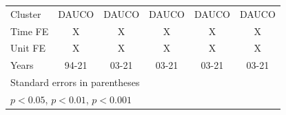 \begin{table}[htbp]
\begin{tabular}{l*{5}{c}}
Cluster             &       DAUCO         &       DAUCO         &       DAUCO         &       DAUCO         &       DAUCO         \\
Time FE             &           X         &           X         &           X         &           X         &           X         \\
Unit FE             &           X         &           X         &           X         &           X         &           X         \\
Years               &       94-21         &       03-21         &       03-21         &       03-21         &       03-21         \\
\hline\hline
\multicolumn{6}{l}{\footnotesize Standard errors in parentheses}\\
\multicolumn{6}{l}{\footnotesize \sym{*} \(p<0.05\), \sym{**} \(p<0.01\), \sym{***} \(p<0.001\)}\\
\end{tabular}
\end{table}
